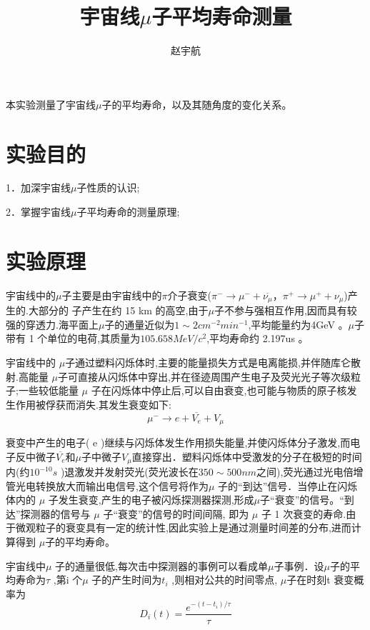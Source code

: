 \documentclass[hyperref]{ctexart}
\title{\textbf{宇宙线$\mu$子平均寿命测量}}
\author{\sffamily 赵宇航}
\date{}
\begin{document}
\maketitle
{}本实验测量了宇宙线$\mu$子的平均寿命，以及其随角度的变化关系。\\	
	\section{实验目的}
	1．加深宇宙线$\mu$子性质的认识;
	
	2．掌握宇宙线$\mu$子平均寿命的测量原理;

	\section{实验原理}
	宇宙线中的$\mu$子主要是由宇宙线中的$\pi$介子衰变($\pi^- \rightarrow \mu^- + \overline{\nu_{\mu}}$，$\pi^+\rightarrow \mu^+ + \nu_{\mu}$)产生的.大部分的 子产生在约 15 km 的高空,由于$\mu$子不参与强相互作用,因而具有较强的穿透力.海平面上$\mu$子的通量近似为$1 \sim 2 cm^{-2} min^{-1}$,平均能量约为4GeV 。$\mu$子带有 1 个单位的电荷,其质量$为105.658MeV /c^2 $,平均寿命约 2.197us 。

	宇宙线中的 $\mu$子通过塑料闪烁体时,主要的能量损失方式是电离能损,并伴随库仑散射.高能量 $\mu$子可直接从闪烁体中穿出,并在径迹周围产生电子及荧光光子等次级粒子;一些较低能量 $\mu$ 子在闪烁体中停止后,可以自由衰变,也可能与物质的原子核发生作用被俘获而消失.其发生衰变如下:
	\begin{equation}
	\mu^- \rightarrow e + \overline{V_e} + V_{\mu}
	\end{equation}

	衰变中产生的电子( e )继续与闪烁体发生作用损失能量,并使闪烁体分子激发,而电子反中微子$\overline{V_e} $和$\mu$子中微子$V_{\mu} $直接穿出．塑料闪烁体中受激发的分子在极短的时间内(约$10^{-10} s$ )退激发并发射荧光(荧光波长在$350 \sim 500nm $之间),荧光通过光电倍增管光电转换放大而输出电信号,这个信号将作为$\mu$ 子的“到达”信号．当停止在闪烁体内的 $\mu$ 子发生衰变,产生的电子被闪烁探测器探测,形成$\mu$子“衰变”的信号。“到达”探测器的信号与 $\mu$ 子“衰变”的信号的时间间隔, 即为 $\mu$ 子 1 次衰变的寿命.由于微观粒子的衰变具有一定的统计性,因此实验上是通过测量时间差的分布,进而计算得到 $\mu$子的平均寿命。

	宇宙线中$\mu$ 子的通量很低,每次击中探测器的事例可以看成单$\mu$子事例．设$\mu$子的平均寿命为$\tau$ ,第i 个$\mu$ 子的产生时间为$t_i$ ,则相对公共的时间零点, $\mu$子在时刻t 衰变概率为
	\begin{equation}
	D_i(t)=\frac{e^{-(t-t_i)/\tau}}{\tau}
	\end{equation}
\end{document}

